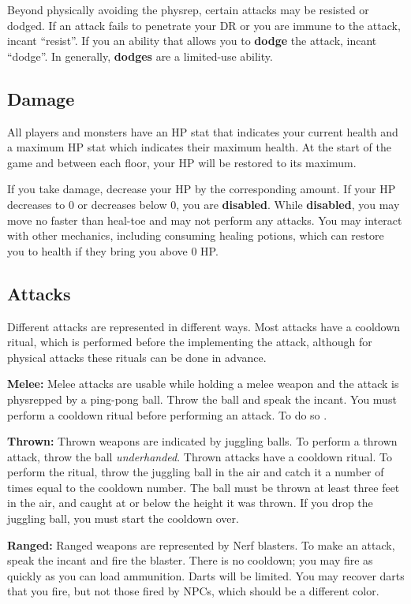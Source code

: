 \documentclass[green]{grimrock}
\begin{document}
Beyond physically avoiding the physrep, certain attacks may be resisted or dodged.  If an attack fails to penetrate your DR or you are immune to the attack, incant ``resist''.  If you an ability that allows you to {\bf dodge} the attack, incant ``dodge''.  In generally, {\bf dodges} are a limited-use ability.

\subsection{Damage}  All players and monsters have an HP stat that indicates your current health and a maximum HP stat which indicates their maximum health.  At the start of the game and between each floor, your HP will be restored to its maximum. 

If you take damage, decrease your HP by the corresponding amount.  If your HP decreases to 0 or decreases below 0, you are {\bf disabled}.  While {\bf disabled}, you may move no faster than heal-toe and may not perform any attacks.  You may interact with other mechanics, including consuming healing potions, which can restore you to health if they bring you above 0 HP.

\subsection{Attacks}
Different attacks are represented in different ways.  Most attacks have a cooldown ritual, which is performed before the implementing the attack, although for physical attacks these rituals can be done in advance.

{\bf Melee:} Melee attacks are usable while holding a melee weapon and the attack is physrepped by a ping-pong ball.  Throw the ball and speak the incant.  You must perform a cooldown ritual before performing an attack.  To do so .

{\bf Thrown:}  Thrown weapons are indicated by juggling balls.  To perform a thrown attack, throw the ball \emph{underhanded}.  Thrown attacks have a cooldown ritual.  To perform the ritual, throw the juggling ball in the air and catch it a number of times equal to the cooldown number.  The ball must be thrown at least three feet in the air, and caught at or below the height it was thrown.  If you drop the juggling ball, you must start the cooldown over.

{\bf Ranged:} Ranged weapons are represented by Nerf blasters.  To make an attack, speak the incant and fire the blaster.  There is no cooldown; you may fire as quickly as you can load ammunition.  Darts will be limited.  You may recover darts that you fire, but not those fired by NPCs, which should be a different color.
\end{document}
